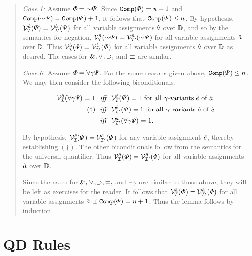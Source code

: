 \begin{quote}
  \textit{Case 1:} Assume $\metaA=\enot\metaB$.
  Since $\texttt{Comp}(\varPhi)=n+1$ and $\comp(\enot\metaB)=\comp(\metaB)+1$, it follows that $\texttt{Comp}(\varPsi)\leq n$.
  By hypothesis, $\mathcal{V}_{\mathcal{I}}^{\hat{a}}(\varPsi)=\mathcal{V}_{\mathcal{I}'}^{\hat{a}}(\varPsi)$ for all variable assignments $\hat{a}$ over $\mathbb{D}$, and so by the semantics for negation, $\VV{\I}{\va{a}}(\enot\metaB)=\VV{\I'}{\va{a}}(\enot\metaB)$ for all variable assignments $\hat{a}$ over $\mathbb{D}$.
  Thus $\mathcal{V}_{\mathcal{I}}^{\hat{a}}(\varPhi)=\mathcal{V}_{\mathcal{I}'}^{\hat{a}}(\varPhi)$ for all variable assignments $\hat{a}$ over $\mathbb{D}$ as desired. 
  The cases for $\mathrel\&,\mkern1mu\vee\mkern1mu,\supset,$ and $\equiv$ are similar.

  \textit{Case 6:} Assume $\varPhi=\forall \gamma\varPsi$.
  For the same reasons given above, $\texttt{Comp}(\varPsi)\leq n$.
  We may then consider the following biconditionals:

  \vspace{-.2in}
  \begin{align*}
    \mathcal{V}_{\mathcal{I}}^{\hat{a}}(\forall \gamma\varPsi)=1 &\textit{ ~iff~ } \mathcal{V}_{\mathcal{I}}^{\hat{e}}(\varPsi)=1 \text{ for all } \gamma\text{-variants } \hat{e} \text{ of } \hat{a}\\ 
      (\dagger) &\textit{ ~iff~ } \mathcal{V}_{\mathcal{I}'}^{\hat{e}}(\varPsi)=1 \text{ for all } \gamma\text{-variants } \hat{e} \text{ of } \hat{a}\\  
      &\textit{ ~iff~ } \mathcal{V}_{\mathcal{I}'}^{\hat{a}}(\forall \gamma\varPsi)=1.
  \end{align*}

  By hypothesis, $\mathcal{V}_{\mathcal{I}}^{\hat{e}}(\varPsi)=\mathcal{V}_{\mathcal{I}'}^{\hat{e}}(\varPsi)$ for any variable assignment $\hat{e}$, thereby establishing $(\dagger)$.
  The other biconditionals follow from the semantics for the universal quantifier.
  Thus $\mathcal{V}_{\mathcal{I}}^{\hat{a}}(\varPhi)=\mathcal{V}_{\mathcal{I}'}^{\hat{a}}(\varPhi)$ for all variable assignments $\hat{a}$ over $\mathbb{D}$. 

  Since the cases for $\mathrel\&,\mkern1mu\vee\mkern1mu,\supset,\equiv,$ and $\exists \gamma$ are similar to those above, they will be left as exercises for the reader.
  It follows that $\mathcal{V}_{\mathcal{I}}^{\hat{a}}(\varPhi)=\mathcal{V}_{\mathcal{I}'}^{\hat{a}}(\varPhi)$ for all variable assignments $\hat{a}$ if $\texttt{Comp}(\varPhi)=n+1$.
  Thus the lemma follows by induction.
\end{quote}






\section{QD Rules}%
  \label{sec:QDRules}

